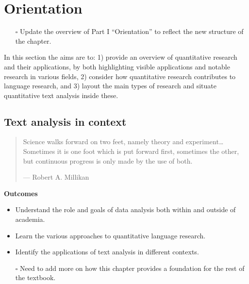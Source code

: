 \documentclass[
  letterpaper,
]{latex/krantz}
\providecommand{\tightlist}{%
  \setlength{\itemsep}{0pt}\setlength{\parskip}{0pt}}\usepackage{longtable,booktabs,array}
\begin{document}
\part{Orientation}

\begin{itemize}
\tightlist
\item[$\square$]
  Update the overview of Part I ``Orientation'' to reflect the new
  structure of the chapter.
\end{itemize}

In this section the aims are to: 1) provide an overview of quantitative
research and their applications, by both highlighting visible
applications and notable research in various fields, 2) consider how
quantitative research contributes to language research, and 3) layout
the main types of research and situate quantitative text analysis inside
these.

\hypertarget{sec-text-analysis-in-context}{%
\chapter{Text analysis in context}\label{sec-text-analysis-in-context}}

\begin{quote}
Science walks forward on two feet, namely theory and
experiment\ldots Sometimes it is one foot which is put forward first,
sometimes the other, but continuous progress is only made by the use of
both.

--- Robert A. Millikan
\end{quote}

\begin{tcolorbox}[enhanced jigsaw, arc=.35mm, leftrule=.75mm, rightrule=.15mm, opacityback=0, colback=white, breakable, bottomrule=.15mm, left=2mm, toprule=.15mm]

\textbf{ Outcomes}

\begin{itemize}
\tightlist
\item
  Understand the role and goals of data analysis both within and outside
  of academia.
\item
  Learn the various approaches to quantitative language research.
\item
  Identify the applications of text analysis in different contexts.
\end{itemize}

\end{tcolorbox}

\begin{itemize}
\tightlist
\item[$\square$]
  Need to add more on how this chapter provides a foundation for the
  rest of the textbook.
\end{itemize}
\end{document}

